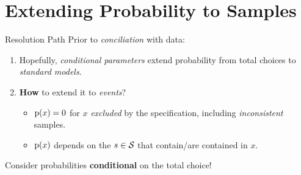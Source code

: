 \documentclass{beamer}
\newcommand{\at}[1]{\ensuremath{\!\del{#1}}}
\newcommand{\fml}[1]{\ensuremath{{\cal #1}}}
\newcommand{\pr}[1]{\ensuremath{\mathrm{p}\at{#1}}}
\begin{document}
\section{Extending Probability to Samples}
\begin{frame}{Resolution Path}
    Prior to \textit{conciliation} with data:
    \begin{enumerate}
        \item \alert{Hopefully}, \textit{conditional parameters} extend probability from total choices to \textit{standard models}.
        \item \textbf{How} to extend it to \textit{events}?
        \begin{itemize}
            \item $\pr{x} = 0$ for $x$ \textit{excluded} by the specification, including \textit{inconsistent} samples.
            \item $\pr{x}$ depends on the $s \in \fml{S}$ that contain/are contained in $x$.
        \end{itemize}
    \end{enumerate}
    \alert{Consider probabilities \textbf{conditional} on the total choice!}
\end{frame}
\end{document}
